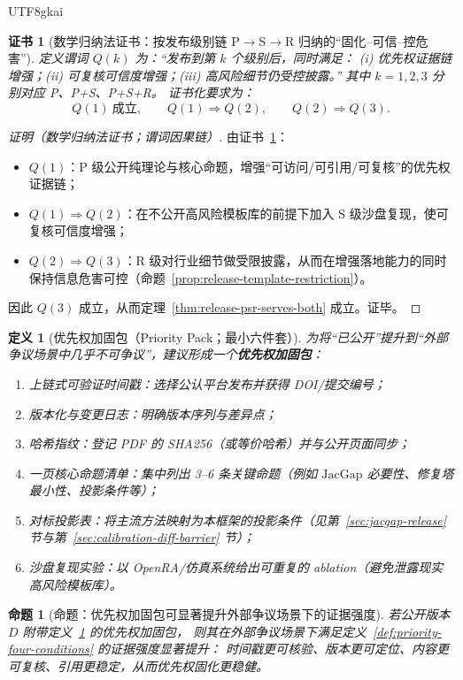 \documentclass[12pt]{article}
\newtheorem{definition}{定义}[section]
\newtheorem{proposition}{命题}[section]
\newtheorem{Certificate}{证书}[section]
\newcommand{\JacGap}{\ensuremath{\mathrm{JacGap}}} %
\begin{document}
\begin{CJK*}{UTF8}{gkai}
\begin{Certificate}[数学归纳法证书：按发布级别链 P$\to$S$\to$R 归纳的“固化--可信--控危害”]
\label{cert:release-psr-serves-both}
定义谓词 $Q(k)$ 为：“发布到第 $k$ 个级别后，同时满足：
(i) 优先权证据链增强；(ii) 可复核可信度增强；(iii) 高风险细节仍受控披露。”
其中 $k=1,2,3$ 分别对应 P、P+S、P+S+R。
证书化要求为：
\[
  Q(1)\ \text{成立},\qquad Q(1)\Rightarrow Q(2),\qquad Q(2)\Rightarrow Q(3).
\]
\end{Certificate}

\begin{proof}[证明（数学归纳法证书；谓词因果链）]
由证书~\ref{cert:release-psr-serves-both}：
\begin{itemize}
  \item $Q(1)$：P 级公开纯理论与核心命题，增强“可访问/可引用/可复核”的优先权证据链；
  \item $Q(1)\Rightarrow Q(2)$：在不公开高风险模板库的前提下加入 S 级沙盘复现，使可复核可信度增强；
  \item $Q(2)\Rightarrow Q(3)$：R 级对行业细节做受限披露，从而在增强落地能力的同时保持信息危害可控（命题~\ref{prop:release-template-restriction}）。
\end{itemize}
因此 $Q(3)$ 成立，从而定理~\ref{thm:release-psr-serves-both} 成立。证毕。
\end{proof}

\begin{definition}[优先权加固包（Priority Pack；最小六件套）]
\label{def:priority-pack}
为将“已公开”提升到“外部争议场景中几乎不可争议”，建议形成一个\textbf{优先权加固包}：
\begin{enumerate}
  \item 上链式可验证时间戳：选择公认平台发布并获得 DOI/提交编号；
  \item 版本化与变更日志：明确版本序列与差异点；
  \item 哈希指纹：登记 PDF 的 SHA256（或等价哈希）并与公开页面同步；
  \item 一页核心命题清单：集中列出 3--6 条关键命题（例如 \JacGap{} 必要性、修复塔最小性、投影条件等）；
  \item 对标投影表：将主流方法映射为本框架的投影条件（见第~\ref{sec:jacgap-release} 节与第~\ref{sec:calibration-diff-barrier} 节）；
  \item 沙盘复现实验：以 OpenRA/仿真系统给出可重复的 ablation（避免泄露现实高风险模板库）。
\end{enumerate}
\end{definition}

\begin{proposition}[命题：优先权加固包可显著提升外部争议场景下的证据强度]
\label{prop:priority-pack-strengthens}
若公开版本 $D$ 附带定义~\ref{def:priority-pack} 的优先权加固包，
则其在外部争议场景下满足定义~\ref{def:priority-four-conditions} 的证据强度显著提升：
时间戳更可核验、版本更可定位、内容更可复核、引用更稳定，从而优先权固化更稳健。
\end{proposition}


\end{CJK*}
\end{document}
